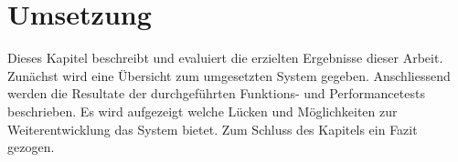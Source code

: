 \section{Umsetzung}

Dieses Kapitel beschreibt und evaluiert die erzielten Ergebnisse dieser Arbeit.
Zunächst wird eine Übersicht zum umgesetzten System gegeben.
Anschliessend werden die Resultate der durchgeführten Funktions- und Performancetests beschrieben.
Es wird aufgezeigt welche Lücken und Möglichkeiten zur Weiterentwicklung das System bietet.
Zum Schluss des Kapitels ein Fazit gezogen.





\clearpage

